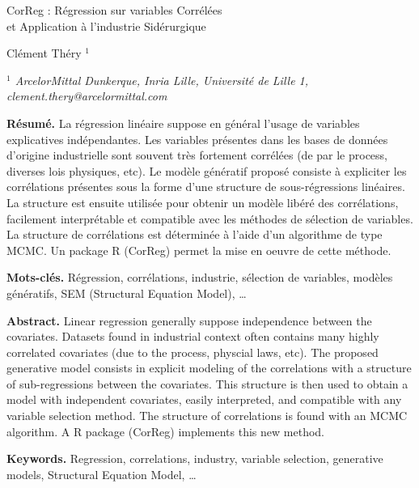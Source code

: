 \documentclass[12pt]{article}
\begin{document}

\begin{center}
{\Large
	{\sc  CorReg : Régression sur variables Corrélées\\ et Application à l'industrie Sidérurgique}
}
\bigskip

 Clément Théry $^{1}$
\bigskip

{\it
$^{1}$ ArcelorMittal Dunkerque, Inria Lille, Université de Lille 1, clement.thery@arcelormittal.com
 
}
\end{center}
\bigskip


{\bf Résumé.} La régression linéaire suppose en général l'usage de variables explicatives indépendantes. Les variables présentes dans les bases de données d'origine industrielle sont souvent très fortement corrélées (de par le process, diverses lois physiques, etc). Le modèle génératif proposé consiste à expliciter les corrélations présentes sous la forme d'une structure de sous-régressions linéaires. La structure est ensuite utilisée pour obtenir un modèle libéré des corrélations, facilement interprétable et compatible avec les méthodes de sélection de variables. La structure de corrélations est déterminée à l'aide d'un algorithme de type MCMC. Un package R (CorReg) permet la mise en oeuvre de cette méthode. 
\smallskip

{\bf Mots-clés.} Régression, corrélations, industrie, sélection de variables, modèles génératifs, SEM (Structural Equation Model), \ldots
\bigskip\bigskip

{\bf Abstract.} Linear regression generally suppose independence between the covariates. Datasets found in industrial context often contains many highly correlated covariates (due to the process, physcial laws, etc). The proposed generative model consists in explicit modeling of the correlations with a structure of sub-regressions between the covariates. This structure is then used to obtain a model with independent covariates, easily interpreted, and compatible with any variable selection method. The structure of correlations is found with an MCMC algorithm. A R package (CorReg) implements this new method.  
\smallskip

{\bf Keywords.} Regression, correlations, industry, variable selection, generative models, Structural Equation Model, \ldots
\end{document}
